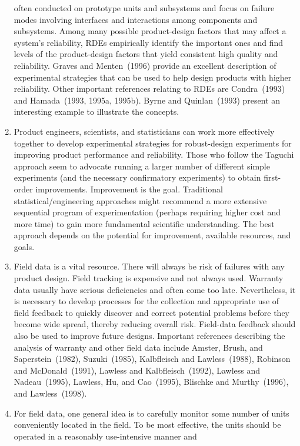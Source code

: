 \begin{enumerate}
often conducted on prototype units and subsystems and focus on
failure modes involving interfaces and interactions among components
and subsystems.  Among many possible product-design factors that may
affect a system's reliability, RDEs empirically identify the
important ones and find levels of the product-design factors that
yield consistent high quality and reliability.  Graves and
Menten~(1996) provide an excellent description of experimental
strategies that can be used to help design products with higher
reliability.  Other important references relating to RDEs are
Condra~(1993) and Hamada~(1993, 1995a, 1995b).  Byrne and
Quinlan~(1993) present an interesting example to illustrate the
concepts.
\item
Product engineers, scientists, and statisticians can work more
effectively together to develop experimental strategies for
robust-design experiments for improving product performance and
reliability.  Those who follow the Taguchi approach seem to advocate
running a larger number of different simple experiments (and the
necessary confirmatory experiments) to obtain first-order
improvements.  Improvement is the goal. Traditional
statistical/engineering approaches might recommend a more extensive
sequential program of experimentation (perhaps requiring higher cost
and more time) to gain more fundamental scientific understanding.
The best approach depends on the potential for improvement,
available resources, and goals.
\item
Field data is a vital resource. There will always be risk of
failures with any product design.  Field tracking is expensive and
not always used. Warranty data usually have serious deficiencies and
often come too late. Nevertheless, it is necessary to develop
processes for the collection and appropriate use of field feedback
to quickly discover and correct potential problems before they
become wide spread, thereby reducing overall risk. Field-data
feedback should also be used to improve future designs.  Important
references describing the analysis of warranty and other field data
include Amster, Brush, and Saperstein~(1982), Suzuki~(1985),
Kalbfleisch and Lawless~(1988), Robinson and McDonald~(1991),
Lawless and Kalbfleisch~(1992), Lawless and Nadeau~(1995), Lawless,
Hu, and Cao~(1995), Blischke and Murthy~(1996), and Lawless~(1998).
\item
For field data, one general idea is to carefully monitor some number
of units conveniently located in the field. To be most effective,
the units should be operated in a reasonably use-intensive manner and

\end{enumerate}
